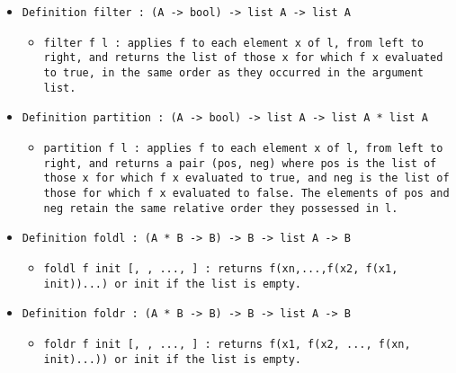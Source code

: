 \documentclass[11pt]{report}
\begin{document}
\begin{itemize}
\item  \texttt{Definition filter : (A -> bool) -> list A -> list A}

\begin{itemize}
\item  \begin{flushleft} \texttt{filter f l : applies f to each element x of l, from left to right, and returns the list of those x for which f x evaluated to true, in the same order as they occurred in the argument list.} \end{flushleft}
\end{itemize}

\item  \texttt{Definition partition : (A -> bool) -> list A -> list A * list A}

\begin{itemize}
\item  \begin{flushleft} \texttt{partition f l : applies f to each element x of l, from left to right, and returns a pair (pos, neg) where pos is the list of those x for which f x evaluated to true, and neg is the list of those for which f x evaluated to false. The elements of pos and neg retain the same relative order they possessed in l.} \end{flushleft}
\end{itemize}

\item  \texttt{Definition foldl : (A * B -> B) -> B -> list A -> B}

\begin{itemize}
\item  \begin{flushleft} \texttt{foldl f init [, , ..., ] : returns f(xn,...,f(x2, f(x1, init))...) or init if the list is empty.} \end{flushleft}
\end{itemize}

\item  \texttt{Definition foldr : (A * B -> B) -> B -> list A -> B}

\begin{itemize}
\item  \begin{flushleft} \texttt{foldr f init [, , ..., ] : returns f(x1, f(x2, ..., f(xn, init)...)) or init if the list is empty.} \end{flushleft}
\end{itemize}


\end{itemize}
\end{document}
